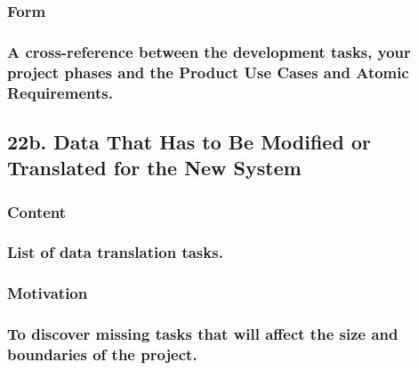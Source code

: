 \documentclass[
]{article}
\begin{document}
\hypertarget{form-35}{%
\subsubsection{Form}\label{form-35}}

\hypertarget{a-cross-reference-between-the-development-tasks-your-project-phases-and-the-product-use-cases-and-atomic-requirements.}{%
\subsubsection{\texorpdfstring{A cross-reference between the development
tasks, your project phases and the Product Use Cases and Atomic
Requirements.
}{A cross-reference between the development tasks, your project phases and the Product Use Cases and Atomic Requirements. }}\label{a-cross-reference-between-the-development-tasks-your-project-phases-and-the-product-use-cases-and-atomic-requirements.}}

\hypertarget{b.-data-that-has-to-be-modified-or-translated-for-the-new-system}{%
\subsection{\texorpdfstring{22b. Data That Has to Be Modified or
Translated for the New System
}{22b. Data That Has to Be Modified or Translated for the New System }}\label{b.-data-that-has-to-be-modified-or-translated-for-the-new-system}}

\hypertarget{content-72}{%
\subsubsection{Content}\label{content-72}}

\hypertarget{list-of-data-translation-tasks.}{%
\subsubsection{List of data translation
tasks.}\label{list-of-data-translation-tasks.}}

\hypertarget{motivation-71}{%
\subsubsection{Motivation}\label{motivation-71}}

\hypertarget{to-discover-missing-tasks-that-will-affect-the-size-and-boundaries-of-the-project.}{%
\subsubsection{To discover missing tasks that will affect the size and
boundaries of the
project.}\label{to-discover-missing-tasks-that-will-affect-the-size-and-boundaries-of-the-project.}}
\end{document}
